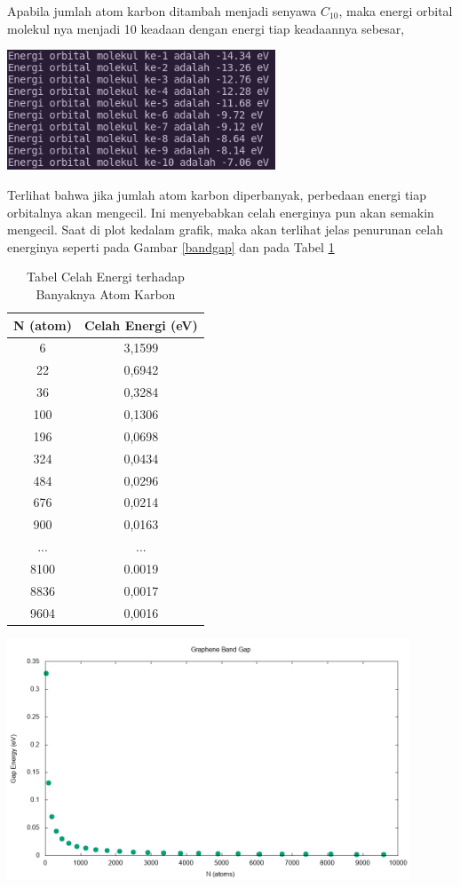 \documentclass[12pt,a4paper]{report}
\begin{document}
Apabila jumlah atom karbon ditambah menjadi senyawa $C_{10}$, maka energi orbital molekul nya menjadi 10 keadaan dengan energi tiap keadaannya sebesar,
\begin{center}
	\includegraphics[width=8cm]{gambar/c10_energy.png}
	\label{c10_ernergy}
\end{center}
Terlihat bahwa jika jumlah atom karbon diperbanyak, perbedaan energi tiap orbitalnya akan mengecil. Ini menyebabkan celah energinya pun akan semakin mengecil. Saat di plot kedalam grafik, maka akan terlihat jelas penurunan celah energinya seperti pada Gambar \ref{bandgap} dan pada Tabel \ref{gaptable}
\begin{table}[h]
	\centering
	\caption{Tabel Celah Energi terhadap Banyaknya Atom Karbon}
	\label{gaptable}
	\begin{tabular}{|c|c|} 
		\hline
		N (atom) & Celah Energi (eV)\\ \hline
		6 & 3,1599 \\ \hline
		22 & 0,6942 \\ \hline
		36 & 0,3284 \\ \hline
		100 & 0,1306 \\ \hline
		196 & 0,0698 \\ \hline
		324 & 0,0434 \\ \hline
		484 & 0,0296 \\ \hline
		676 & 0,0214 \\ \hline
		900 & 0,0163 \\ \hline
		... & ... \\ \hline
		8100 & 0.0019 \\ \hline
		8836 & 0,0017 \\ \hline
		9604 & 0,0016 \\ \hline
	\end{tabular}
\end{table}
\begin{center}
	\includegraphics[width=12cm]{gambar/bandgap.png}
	\label{bandgap}
\end{center}
\end{document}
